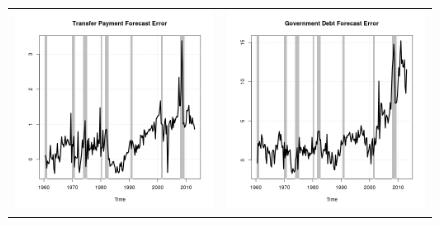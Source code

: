 \documentclass[11pt]{article}
\begin{document}
\begin{figure}
\begin{center}
\begin{tabular}{cc}
\includegraphics[scale=0.45]{./results/pics0.01/fe_transfers.png} & \includegraphics[scale=0.45]{./results/pics0.01/fe_debt.png}  
\end{tabular}
\end{center}
\end{figure} 
\end{document}
